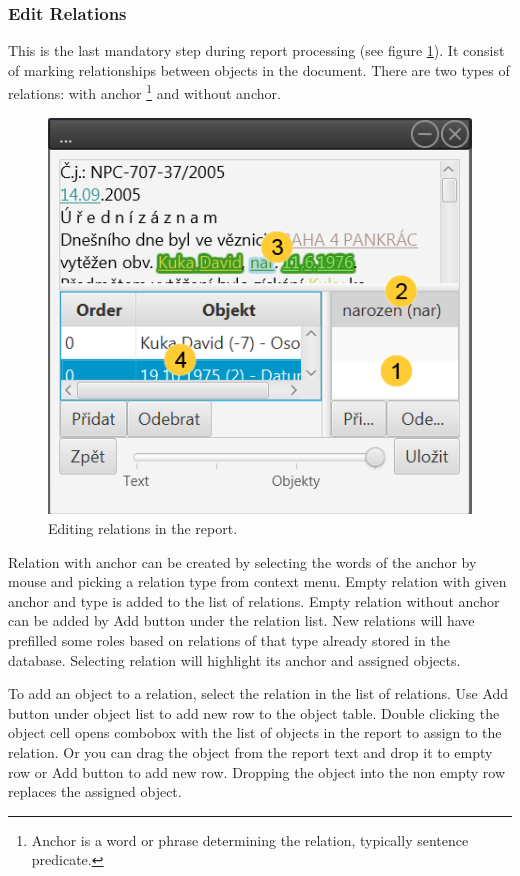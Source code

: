 \documentclass[12pt,a4paper]{report}
\begin{document}
\subsubsection{Edit Relations}
\label{sssec:EditRelations}

This is the last mandatory step during report processing (see figure
\ref{fig:Relations}). It consist of marking relationships between objects in
the document. There are two types of relations: with anchor%
\footnote{Anchor is a word or phrase determining the relation, typically
sentence predicate.}
and without anchor.

\begin{figure}[!htb]
        \centering
        \includegraphics[width=\textwidth]{Images/relations}
        \caption{Editing relations in the report.}
        \label{fig:Relations}
\end{figure}

Relation with anchor can be created by selecting the words of the anchor by
mouse and picking a relation type from context menu. Empty relation with given
anchor and type is added to the list of relations. Empty relation without anchor
can be added by Add button under the relation list. New relations will have
prefilled some roles based on relations of that type already stored in the
database. Selecting relation will highlight its anchor and assigned objects.

To add an object to a relation, select the relation in the list of relations.
Use Add button under object list to add new row to the object table. Double
clicking the object cell opens combobox with the list of objects in the report
to assign to the relation. Or you can drag the object from the report text and
drop it to empty row or Add button to add new row. Dropping the object into the
non empty row replaces the assigned object.
\end{document}
